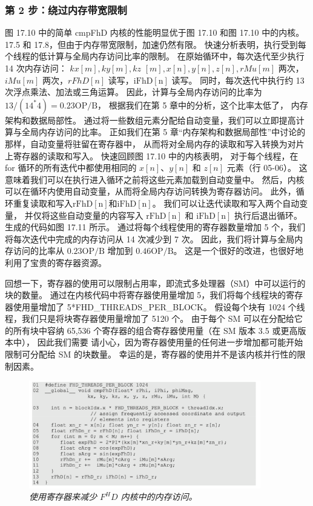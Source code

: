 \subsubsection{第 2 步：绕过内存带宽限制}
图 17.10 中的简单 cmpFhD 内核的性能明显优于图 17.10 和图 17.10 中的内核。 
17.5 和 17.8，但由于内存带宽限制，加速仍然有限。 快速分析表明，执行受到每个线程的低计算与全局内存访问比率的限制。 
在原始循环中，每次迭代至少执行 14 次内存访问： $k x[m], k y[m], k z$ $[m], x[n], y[n], z[n], r M u [m]$ 两次，
$i M u[m]$ 两次，$r F h D[n]$ 读写，$\mathrm{iFhD}[\mathrm{n}]$ 读写。 
同时，每次迭代中执行约 13 次浮点乘法、加法或三角运算。 
因此，计算与全局内存访问的比率为 $13 /\left(14^{*} 4\right)=0.23 \mathrm{OP} / \mathrm{B}$，
根据我们在第 5 章中的分析，这个比率太低了， 内存架构和数据局部性。 
通过将一些数组元素分配给自动变量，我们可以立即提高计算与全局内存访问的比率。 
正如我们在第 5 章“内存架构和数据局部性”中讨论的那样，自动变量将驻留在寄存器中，
从而将对全局内存的读取和写入转换为对片上寄存器的读取和写入。 
快速回顾图 17.10 中的内核表明，
对于每个线程，在 for 循环的所有迭代中都使用相同的 $x[n]、y[n]$ 和 $z[n]$ 元素（行 05-06）。 
这意味着我们可以在执行进入循环之前将这些元素加载到自动变量中。 
然后，内核可以在循环内使用自动变量，从而将全局内存访问转换为寄存器访问。 
此外，循环重复读取和写入$\mathrm{rFhD}[\mathrm{n}]$和$\mathrm{iFhD}[\mathrm{n}]$。 
我们可以让迭代读取和写入两个自动变量，
并仅将这些自动变量的内容写入 $\mathrm{rFhD}[\mathrm{n}]$ 和 $\mathrm{iFhD}[\mathrm{n} ]$ 执行后退出循环。 
生成的代码如图 17.11 所示。 通过将每个线程使用的寄存器数量增加 5 个，我们将每次迭代中完成的内存访问从 14 次减少到 7 次。 
因此，我们将计算与全局内存访问的比率从 $0.23 \mathrm{OP} / \mathrm{B}$ 增加到 $0.46 \mathrm{OP} / \mathrm{B}$。 
这是一个很好的改进，也很好地利用了宝贵的寄存器资源。

回想一下，寄存器的使用可以限制占用率，即流式多处理器（SM）中可以运行的块的数量。 
通过在内核代码中将寄存器使用量增加 5，我们将每个线程块的寄存器使用量增加了 5*FHD\_THREADS\_PER\_BLOCK。 
假设每个块有 1024 个线程，我们只是将块寄存器使用量增加了 5120 个。
由于每个 SM 可以在分配给它的所有块中容纳 65,536 个寄存器的组合寄存器使用量（在 SM 版本 3.5 或更高版本中），
因此我们需要 请小心，因为寄存器使用量的任何进一步增加都可能开始限制可分配给 SM 的块数量。 
幸运的是，寄存器的使用并不是该内核并行性的限制因素。

\begin{figure}[H]
	\centering
	\includegraphics[width=0.9\textwidth]{figs/F17.11.png}
	\caption{\textit{使用寄存器来减少 $F^H D$ 内核中的内存访问。}}
\end{figure}

